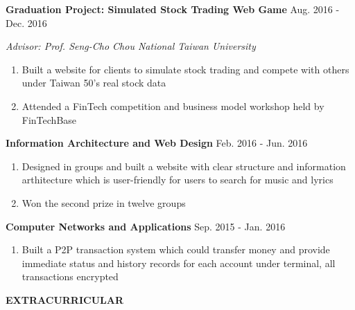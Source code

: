\documentclass[12pt]{article}
\begin{document}
	\vspace{0.5em}

	\textbf{Graduation Project: Simulated Stock Trading Web Game} \hfill Aug. 2016 - Dec. 2016

	\textit{Advisor: Prof. Seng-Cho Chou \hfill National Taiwan University}

	\begin{enumerate}

		\item Built a website for clients to simulate stock trading and compete with others under Taiwan 50's real stock data

		\item Attended a FinTech competition and business model workshop held by FinTechBase

	\end{enumerate}

	\vspace{0.5em}

	\textbf{Information Architecture and Web Design} \hfill Feb. 2016 - Jun. 2016

	\begin{enumerate}

		\item Designed in groups and built a website with clear structure and information arthitecture which is user-friendly for users to search for music and lyrics

		\item Won the second prize in twelve groups

	\end{enumerate}

	\vspace{0.5em}

	\textbf{Computer Networks and Applications} \hfill Sep. 2015 - Jan. 2016

	\begin{enumerate}

		\item Built a P2P transaction system which could transfer money and provide immediate status and history records for each account under terminal, all transactions encrypted

	\end{enumerate}

	\vspace{1em}

\textbf{\large{\uppercase{Extracurricular}}}
\hrulefill{}

	\vspace{0.5em}
\end{document}
